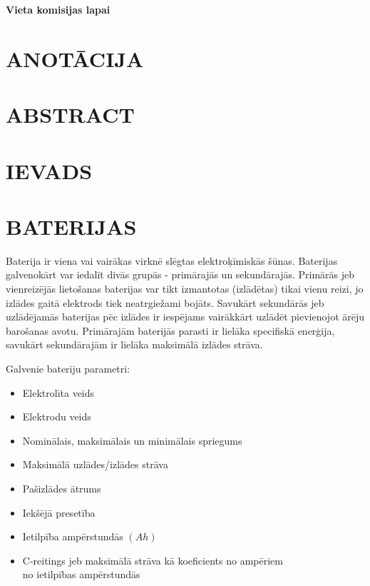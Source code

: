 \documentclass[12pt,fleqn,titlepage,oneside]{article}
\begin{document}
\begin{titlepage}
	\centering
	\vspace*{\fill}
	{\Large\centering\textbf{Vieta komisijas lapai}}
	\vspace*{\fill}
\end{titlepage}

\onehalfspacing
\FloatBarrier
\newpage
\setcounter{page}{4} %
\section*{\MakeUppercase{Anotācija}}

\newpage

\section*{\MakeUppercase{Abstract}}

\newpage
\tableofcontents

\newpage
{}
\section*{\texorpdfstring{\MakeUppercase{Ievads}}{Ievads}}

\FloatBarrier
\newpage
\section{\texorpdfstring{\MakeUppercase{Baterijas}}{Baterijas}}

Baterija ir viena vai vairākas virknē slēgtas elektroķīmiskās šūnas.
Baterijas galvenokārt var iedalīt divās grupās - primārajās un sekundārajās.
Primārās jeb vienreizējās lietošanas baterijas var tikt izmantotas (izlādētas) tikai vienu reizi, jo izlādes gaitā elektrods tiek neatrgiežami bojāts.
Savukārt sekundārās jeb uzlādējamās baterijas pēc izlādes ir iespējams vairākkārt uzlādēt pievienojot ārēju barošanas avotu.
Primārajām baterijās parasti ir lielāka specifiskā enerģija, savukārt sekundārajām ir lielāka maksimālā izlādes strāva.

Galvenie bateriju parametri:
\begin{itemize}
	\item Elektrolīta veids
	\item Elektrodu veids
	\item Nominālais, maksimālais un minimālais spriegums
	\item Maksimālā uzlādes/izlādes strāva
	\item Pašizlādes ātrums
	\item Iekšējā presetība
	\item Ietilpība ampērstundās $(Ah)$
	\item C-reitings jeb maksimālā strāva kā koeficients no ampēriem\\ no ietilpības ampērstundās
\end{itemize}
\end{document}
